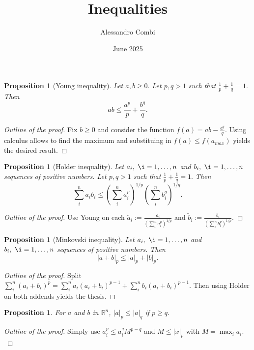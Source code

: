 \documentclass{article}
\title{Inequalities}
\author{Alessandro Combi}
\date{June 2025}
\newcommand{\R}{\mathbb{R}}
\newtheorem{proposition}[theorem]{Proposition}
\begin{document}
\maketitle
\tableofcontents
\clearpage

\begin{proposition}[Young inequality]
    Let $a,b \geq 0.$ Let $p, q > 1$ such that $\frac{1}{p} + \frac{1}{q} = 1.$ 
    Then
    \begin{equation}
        ab \leq \frac{a^p}{p} + \frac{b^q}{q}.
    \end{equation}
\end{proposition}
\begin{proof}[Outline of the proof]
    Fix $b \geq 0$ and consider the function $f(a) = ab - \frac{a^q}{q}.$
    Using calculus allows to find the maximum and substituing in $f(a) \leq f(a_{max})$ yields the desired result.
\end{proof}

\begin{proposition}[Holder inequality]
    Let $a_i,\ \i = 1,\ldots, n$ and $b_i,\ \i = 1,\ldots, n$ sequences of positive numbers. Let $p, q > 1$ such that $\frac{1}{p} + \frac{1}{q} = 1.$ 
    Then
    \begin{equation}
        \sum_i^n a_i b_i \leq \left( \sum_i^n a_i^p \right)^{1/p} \left( \sum_i^n b_i^q \right)^{1/q}.
    \end{equation}
\end{proposition}
\begin{proof}[Outline of the proof]
    Use Young on each $\tilde{a}_i := \frac{a_i}{\left( \sum_i^n a_i^p \right)^{1/p}}$ and $\tilde{b}_i := \frac{b_i}{\left( \sum_i^n b_i^p \right)^{1/p}}$. 
\end{proof}

\begin{proposition}[Minkovski inequality]
    Let $a_i,\ \i = 1,\ldots, n$ and $b_i,\ \i = 1,\ldots, n$ sequences of positive numbers. 
    Then 
    \begin{equation}
        | a + b |_p \leq |a|_p + |b|_p.
    \end{equation}
\end{proposition}
\begin{proof}[Outline of the proof]
    Split $\sum_i^n (a_i + b_i)^p = \sum_i^n a_i (a_i + b_i)^{p-1} + \sum_i^n b_i (a_i + b_i)^{p-1}.$
    Then using Holder on both addends yields the thesis.
\end{proof}

\begin{proposition}
    For $a$ and $b$ in $\R^n$, $|a|_p \le |a|_q$ if $p \ge q.$
\end{proposition}
\begin{proof}[Outline of the proof]
    Simply use $a_i^p \le a_i^q M^{p-q}$ and $M \le |x|_p$ with $M = \max_i a_i.$ 
\end{proof}
\end{document}
